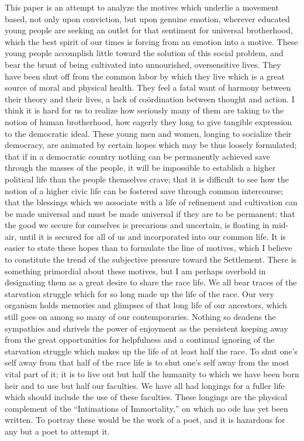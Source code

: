 This paper is an attempt to analyze the motives which underlie a
movement based, not only upon conviction, but upon genuine emotion,
wherever educated young people are seeking an outlet for that
sentiment for universal brotherhood, which the best spirit of our
times is forcing from an emotion into a motive. These young people
accomplish little toward the solution of this social problem, and bear
the brunt of being cultivated into unnourished, oversensitive lives.
They have been shut off from the common labor by which they live which
is a great source of moral and physical health. They feel a fatal want
of harmony between their theory and their lives, a lack of
coördination between thought and action. I think it is hard for us to
realize how seriously many of  them are taking to the notion
of human brotherhood, how eagerly they long to give tangible
expression to the democratic ideal. These young men and women, longing
to socialize their democracy, are animated by certain hopes which may
be thus loosely formulated; that if in a democratic country nothing
can be permanently achieved save through the masses of the people, it
will be impossible to establish a higher political life than the
people themselves crave; that it is difficult to see how the notion of
a higher civic life can be fostered save through common intercourse;
that the blessings which we associate with a life of refinement and
cultivation can be made universal and must be made universal if they
are to be permanent; that the good we secure for ourselves is
precarious and uncertain, is floating in mid-air, until it is secured
for all of us and incorporated into our common life. It is easier to
state these hopes than to formulate the line of motives, which I
believe to constitute the trend of the subjective pressure toward the
Settlement. There is something primordial about these motives, but I
am perhaps overbold in designating them as a great desire to share the
race life. We all bear traces of the starvation struggle which for so
long made up the life of the race. Our very organism holds memories
and glimpses of that long life of our ancestors, which still goes on
among so many of our contemporaries. Nothing so deadens the sympathies
and shrivels the power of enjoyment as the persistent keeping away
from the great opportunities for helpfulness and a continual ignoring
of the starvation struggle which makes up the life of at least half
the race. To shut one's self away from that  half of the
race life is to shut one's self away from the most vital part of it;
it is to live out but half the humanity to which we have been born
heir and to use but half our faculties. We have all had longings for a
fuller life which should include the use of these faculties. These
longings are the physical complement of the ``Intimations of
Immortality,'' on which no ode has yet been written. To portray these
would be the work of a poet, and it is hazardous for any but a poet to
attempt it.

